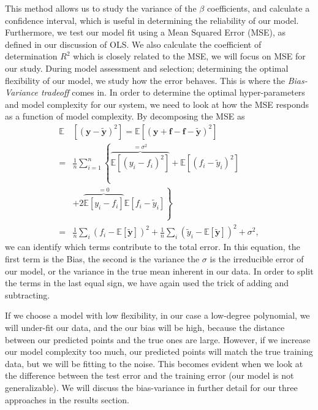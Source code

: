 \documentclass[a4paper, twocolumn]{article}
\begin{document}
This method allows us to study the variance of the $\beta$ coefficients, and calculate a confidence interval, which is useful in determining the reliability of our model. Furthermore, we test our model fit using a Mean Squared Error (MSE), as defined in our discussion of OLS. We also calculate the coefficient of determination $R^2$ which is closely related to the MSE, we will focus on MSE for our study.  During model assessment and selection; determining the optimal flexibility of our model, we study how the error behaves. This is where the \textit{Bias-Variance tradeoff} comes in. In order to determine the optimal hyper-parameters and model complexity for our system, we need to look at how the MSE responds as a function of model complexity. By decomposing the MSE as 
\begin{align}
    \mathbb{E}&\left[(\boldsymbol{y}-\boldsymbol{\tilde{y}})^2\right]=    \mathbb{E}\left[(\boldsymbol{y}+\boldsymbol{f}-\boldsymbol{f}-\boldsymbol{\tilde{y}})^2\right]\\ 
    =& \frac{1}{n}\sum_{i=1}^n\left\{\overbrace{\mathbb{E} \left[(y_i - f_i)^2\right]}^{= \sigma^2} + \mathbb{E}\left[(f_i - \tilde{y}_i)^2\right]\right.\\
    &\left.+2\overbrace{\mathbb{E}\left[y_i - f_i\right]}^{=   0}\mathbb{E}\left[f_i - \tilde{y}_i\right]\right\}\\ 
    =&\frac{1}{n}\sum_i(f_i-\mathbb{E}\left[\boldsymbol{\tilde{y}}\right])^2+\frac{1}{n}\sum_i(\tilde{y}_i-\mathbb{E}\left[\boldsymbol{\tilde{y}}\right])^2+\sigma^2,
\end{align}
we can identify which terms contribute to the total error. In this equation, the first term is the Bias, the second is the variance the $\sigma$ is the irreducible error of our model, or the variance in the true mean inherent in our data. In order to split the terms in the last equal sign, we have again used the trick of adding and subtracting.

If we choose a model with low flexibility, in our case a low-degree polynomial, we will under-fit our data, and the our bias will be high, because the distance between our predicted points and the true ones are large. However, if we increase our model complexity too much, our predicted points will match the true training data, but we will be fitting to the noise. This becomes evident when we look at the difference between the test error and the training error (our model is not generalizable). We will discuss the bias-variance in further detail for our three approaches in the results section.
\end{document}
